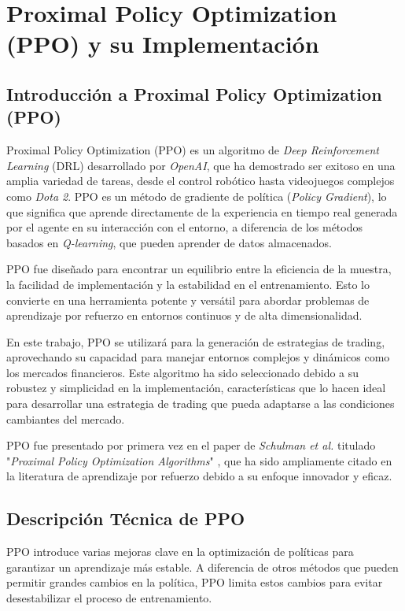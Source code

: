 \documentclass[a4paper,12pt]{report}
\begin{document}
\section{Proximal Policy Optimization (PPO) y su Implementación}

\subsection{Introducción a Proximal Policy Optimization (PPO)}

Proximal Policy Optimization (PPO) es un algoritmo de \textit{Deep Reinforcement Learning} 
(DRL) desarrollado por \textit{OpenAI}, que ha demostrado ser exitoso en una amplia variedad 
de tareas, desde el control robótico hasta videojuegos complejos como \textit{Dota 2}. 
PPO es un método de gradiente de política (\textit{Policy Gradient}), lo que significa 
que aprende directamente de la experiencia en tiempo real generada por el agente en su 
interacción con el entorno, a diferencia de los métodos basados en \textit{Q-learning}, 
que pueden aprender de datos almacenados.

PPO fue diseñado para encontrar un equilibrio entre la eficiencia de la muestra, la facilidad 
de implementación y la estabilidad en el entrenamiento. Esto lo convierte en una herramienta 
potente y versátil para abordar problemas de aprendizaje por refuerzo en entornos continuos y 
de alta dimensionalidad.

En este trabajo, PPO se utilizará para la generación de estrategias de trading, aprovechando 
su capacidad para manejar entornos complejos y dinámicos como los mercados financieros. Este 
algoritmo ha sido seleccionado debido a su robustez y simplicidad en la implementación, 
características que lo hacen ideal para desarrollar una estrategia de trading que pueda 
adaptarse a las condiciones cambiantes del mercado.

PPO fue presentado por primera vez en el paper de \textit{Schulman et al.} titulado 
"\textit{Proximal Policy Optimization Algorithms}" \cite{Schulman2017}, que ha sido ampliamente 
citado en la literatura de aprendizaje por refuerzo debido a su enfoque innovador y eficaz.

\subsection{Descripción Técnica de PPO}

PPO introduce varias mejoras clave en la optimización de políticas para garantizar un 
aprendizaje más estable. A diferencia de otros métodos que pueden permitir grandes cambios 
en la política, PPO limita estos cambios para evitar desestabilizar el proceso de entrenamiento.
\end{document}
